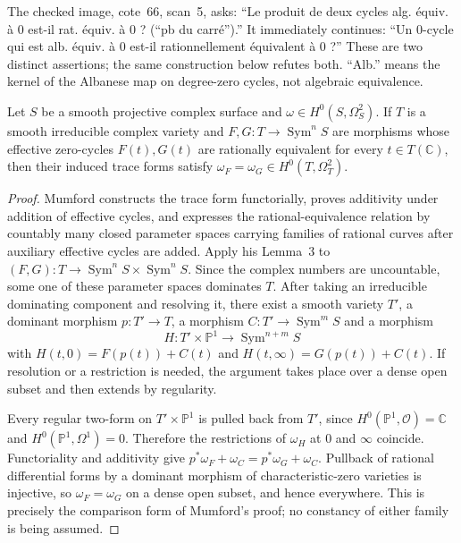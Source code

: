 The checked image, cote~66, scan~5, asks: ``Le produit de deux cycles alg. \'equiv. \`a $0$ est-il rat. \'equiv. \`a $0$ ? (\textnormal{``pb du carr\'e''}).'' It immediately continues: ``Un $0$-cycle qui est alb. \'equiv. \`a $0$ est-il rationnellement \'equivalent \`a $0$ ?'' These are two distinct assertions; the same construction below refutes both. ``Alb.'' means the kernel of the Albanese map on degree-zero cycles, not algebraic equivalence.

\begin{lemma}\label{B:trace}
Let $S$ be a smooth projective complex surface and $\omega\in H^0(S,\Omega_S^2)$. If $T$ is a smooth irreducible complex variety and $F,G:T\to\operatorname{Sym}^n S$ are morphisms whose effective zero-cycles $F(t),G(t)$ are rationally equivalent for every $t\in T(\mathbb C)$, then their induced trace forms satisfy $\omega_F=\omega_G\in H^0(T,\Omega_T^2)$.
\end{lemma}
\begin{proof}
Mumford \cite[\S1 and \S2, Lemmas 2--3, pp.~197--203]{BMumford1969} constructs the trace form functorially, proves additivity under addition of effective cycles, and expresses the rational-equivalence relation by countably many closed parameter spaces carrying families of rational curves after auxiliary effective cycles are added. Apply his Lemma~3 to $(F,G):T\to\operatorname{Sym}^nS\times\operatorname{Sym}^nS$. Since the complex numbers are uncountable, some one of these parameter spaces dominates $T$. After taking an irreducible dominating component and resolving it, there exist a smooth variety $T'$, a dominant morphism $p:T'\to T$, a morphism $C:T'\to\operatorname{Sym}^mS$ and a morphism
\[
 H:T'\times\mathbb P^1\longrightarrow\operatorname{Sym}^{n+m}S
\]
with $H(t,0)=F(p(t))+C(t)$ and $H(t,\infty)=G(p(t))+C(t)$. If resolution or a restriction is needed, the argument takes place over a dense open subset and then extends by regularity.

Every regular two-form on $T'\times\mathbb P^1$ is pulled back from $T'$, since $H^0(\mathbb P^1,\mathcal O)=\mathbb C$ and $H^0(\mathbb P^1,\Omega^1)=0$. Therefore the restrictions of $\omega_H$ at $0$ and $\infty$ coincide. Functoriality and additivity give $p^*\omega_F+\omega_C=p^*\omega_G+\omega_C$. Pullback of rational differential forms by a dominant morphism of characteristic-zero varieties is injective, so $\omega_F=\omega_G$ on a dense open subset, and hence everywhere. This is precisely the comparison form of Mumford's proof; no constancy of either family is being assumed.
\end{proof}

